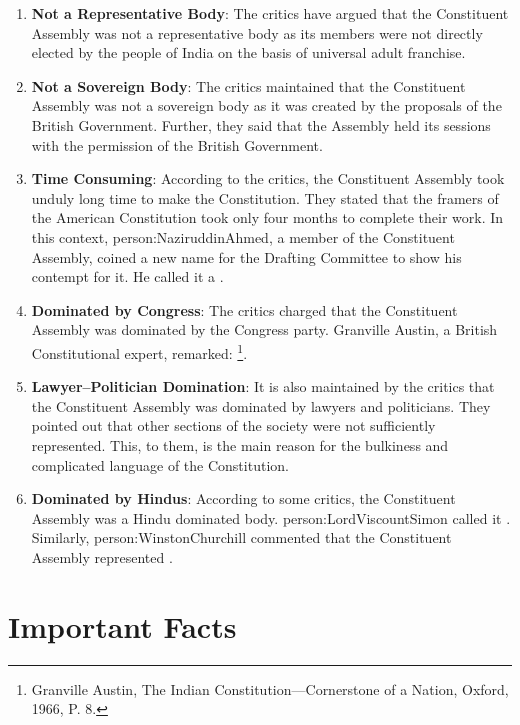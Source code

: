 \begin{enumerate}
  \item \textbf{Not a Representative Body}: The critics have argued that the Constituent  Assembly was not a representative body as its members were not directly elected by the people of India on the basis of universal adult franchise.
  \item \textbf{Not a Sovereign Body}: The critics maintained that the Constituent Assembly was not a sovereign body as it was created by the proposals of the British Government. Further, they said that the Assembly held its sessions with the permission of the British Government.
  \item \textbf{Time Consuming}: According to the critics, the Constituent Assembly took unduly long time to make the Constitution. They stated that the framers of the American Constitution took only four months to complete their work. In this context, \gls{person:NaziruddinAhmed}, a member of the Constituent Assembly, coined a new name for the Drafting Committee to show his contempt for it. He called it a .
  \item \textbf{Dominated by Congress}: The critics charged that the Constituent Assembly was dominated by the Congress party. Granville Austin, a British Constitutional expert, remarked: \footnote{Granville Austin, The Indian Constitution—Cornerstone of a Nation, Oxford, 1966, P. 8.}.
  \item \textbf{Lawyer–Politician Domination}: It is also maintained by the critics that the Constituent Assembly was dominated by lawyers and politicians. They pointed out that other sections of the society were not sufficiently represented. This, to them, is the main reason for the bulkiness and complicated language of the Constitution.
  \item \textbf{Dominated by Hindus}: According to some critics, the Constituent Assembly was a Hindu dominated body. \gls{person:LordViscountSimon} called it . Similarly, \gls{person:WinstonChurchill} commented that the Constituent Assembly represented .
\end{enumerate}


\section{Important Facts}

